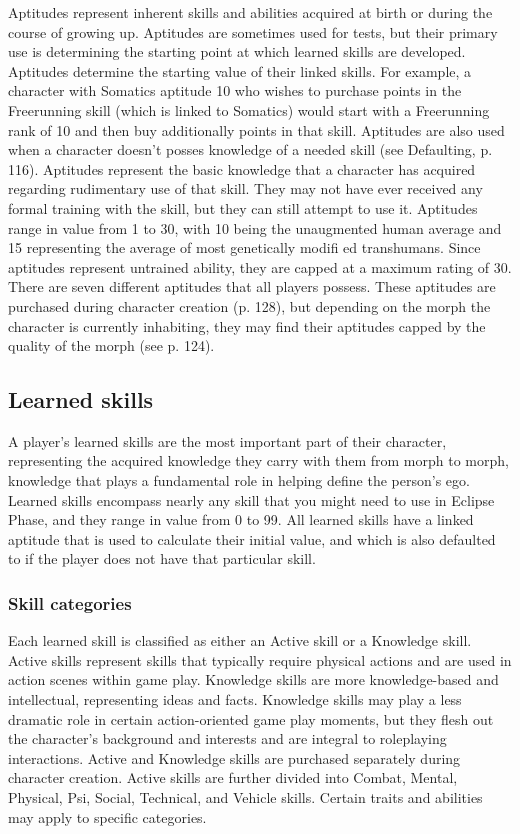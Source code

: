 Aptitudes represent inherent skills and abilities acquired at birth or during the course of growing up. Aptitudes are sometimes used for tests, but their primary use is determining the starting point at which learned skills are developed. Aptitudes determine the starting value of their linked skills. For example, a character with Somatics aptitude 10 who wishes to purchase points in the Freerunning skill (which is linked to Somatics) would start with a Freerunning rank of 10 and then buy additionally points in that skill. Aptitudes are also used when a character doesn’t posses knowledge of a needed skill (see Defaulting, p.
116). Aptitudes represent the basic knowledge that a character has acquired regarding rudimentary use of that skill. They may not have ever received any formal training with the skill, but they can still attempt to use it. Aptitudes range in value from 1 to 30, with 10 being the unaugmented human average and 15 representing the average of most genetically modifi ed transhumans. Since aptitudes represent untrained ability, they are capped at a maximum rating of 30. There are seven different aptitudes that all players possess. These aptitudes are purchased during character creation (p. 128), but depending on the morph the character is currently inhabiting, they may find their aptitudes capped by the quality of the morph (see p. 124).


\subsection{Learned skills}
\label{sec:skills:learned-skills}

A player’s learned skills are the most important part of their character, representing the acquired knowledge they carry with them from morph to morph, knowledge that plays a fundamental role in helping define the person’s ego. Learned skills encompass nearly any skill that you might need to use in Eclipse Phase, and they range in value from 0 to 99. All learned skills have a linked aptitude that is used to calculate their initial value, and which is also defaulted to if the player does not have that particular skill.


\subsubsection{Skill categories}
\label{sec:skills:skill-categories}

Each learned skill is classified as either an Active skill or a Knowledge skill. Active skills represent skills that typically require physical actions and are used in action scenes within game play. Knowledge skills are more knowledge-based and intellectual, representing ideas and facts. Knowledge skills may play a less dramatic role in certain action-oriented game play moments, but they flesh out the character’s background and interests and are integral to roleplaying interactions. Active and Knowledge skills are purchased separately during character creation. Active skills are further divided into Combat, Mental, Physical, Psi, Social, Technical, and Vehicle skills. Certain traits and abilities may apply to specific categories.


